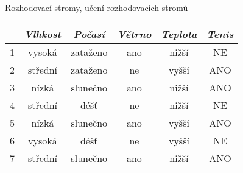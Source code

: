 \documentclass{beamer}
\begin{document}
\begin{section}{Rozhodovací stromy, učení rozhodovacích stromů}
{		\begin{center}
		\begin{tabular}{ c c c c c | c }
		  \textit{} & \textit{Vlhkost} & \textit{Počasí} & \textit{Větrno} & \textit{Teplota} & \textit{Tenis} \\
			\midrule
		  1 & vysoká & zataženo & ano & nižší & NE \\
		  2 & střední  & zataženo & ne & vyšší & ANO  \\
		  3 & nízká  & slunečno & ano & nižší & ANO  \\
		  4 & střední  & déšť & ne & nižší & NE  \\
		  5 & nízká  & slunečno & ano & vyšší & ANO  \\
		  6 & vysoká  & déšť & ne & vyšší & NE  \\
		  7 & střední  & slunečno & ano & nižší & ANO  \\
		\end{tabular}
		\end{center}
    }

\end{section}
\end{document}
